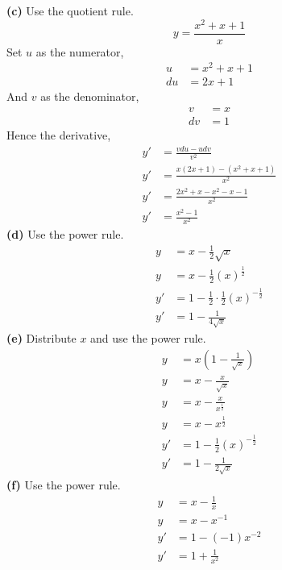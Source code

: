 \documentclass[hidelinks, a4paper, 12pt]{article}
\newcommand{\bd}{\textbf}
\begin{document}
                \bd{(c)} Use the quotient rule.
                \[y = \frac{x^2+x+1}{x}\]
                Set $u$ as the numerator,
                \[\begin{split}
                    u &= x^2 + x + 1\\
                    du &= 2x + 1
                \end{split}\]
                And $v$ as the denominator,
                \[\begin{split}
                    v &= x\\
                    dv &= 1
                \end{split}\]
                Hence the derivative,
                \[\begin{split}
                    y' &= \frac{vdu-udv}{v^2}\\
                    y' &= \frac{x(2x + 1)-(x^2 + x + 1)}{x^2}\\
                    y' &= \frac{2x^2+x-x^2-x-1}{x^2}\\
                    y' &= \frac{x^2-1}{x^2}
                \end{split}\]
                \bd{(d)} Use the power rule.
                \[\begin{split}
                    y &= x - \frac{1}{2}\sqrt{x}\\
                    y &= x - \frac{1}{2}(x)^{\frac{1}{2}}\\
                    y' &= 1 - \frac{1}{2}\cdot \frac{1}{2}(x)^{-\frac{1}{2}}\\
                    y' &= 1 - \frac{1}{4\sqrt{x}}
                \end{split}\]
                \bd{(e)} Distribute $x$ and use the power rule.
                \[\begin{split}
                    y &= x\left(1-\frac{1}{\sqrt{x}}\right)\\
                    y &= x - \frac{x}{\sqrt{x}}\\
                    y &= x - \frac{x}{x^{\frac{1}{2}}}\\
                    y &= x - x^{\frac{1}{2}}\\
                    y' &= 1 - \frac{1}{2}(x)^{-\frac{1}{2}}\\
                    y' &= 1 - \frac{1}{2\sqrt{x}}
                \end{split}\]
                \bd{(f)} Use the power rule.
                \[\begin{split}
                    y &= x - \frac{1}{x}\\
                    y &= x - x^{-1}\\
                    y' &= 1 -(-1)x^{-2}\\
                    y' &= 1+\frac{1}{x^2}
                \end{split}\]
\end{document}
